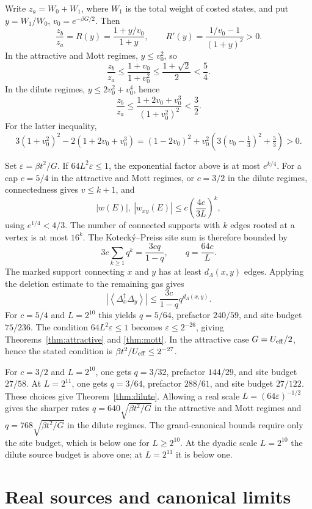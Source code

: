 \documentclass[11pt]{article}
\newcommand{\Deltaop}{\Delta}
\begin{document}
Write $z_a=W_0+W_1$, where $W_1$ is the total weight of costed states, and put $y=W_1/W_0$, $v_0=e^{-\beta G/2}$. Then
\[
 \frac{z_b}{z_a}=R(y)=\frac{1+y/v_0}{1+y},
 \qquad R'(y)=\frac{1/v_0-1}{(1+y)^2}>0.
\]
In the attractive and Mott regimes, $y\le v_0^2$, so
\[
 \frac{z_b}{z_a}\le\frac{1+v_0}{1+v_0^2}
 \le\frac{1+\sqrt2}{2}<\frac54.
\]
In the dilute regimes, $y\le2v_0^2+v_0^4$, hence
\[
 \frac{z_b}{z_a}\le\frac{1+2v_0+v_0^3}{(1+v_0^2)^2}<\frac32.
\]
For the latter inequality,
\[
 3(1+v_0^2)^2-2(1+2v_0+v_0^3)
 =(1-2v_0)^2+v_0^2\left(3(v_0-\tfrac13)^2+\tfrac53\right)>0.
\]

Set $\varepsilon=\beta t^2/G$. If $64L^2\varepsilon\le1$, the exponential factor above is at most $e^{k/4}$. For a cap $c=5/4$ in the attractive and Mott regimes, or $c=3/2$ in the dilute regimes, connectedness gives $v\le k+1$, and
\[
 |w(E)|,\ |w_{xy}(E)|\le c\left(\frac{4c}{3L}\right)^k,
\]
using $e^{1/4}<4/3$. The number of connected supports with $k$ edges rooted at a vertex is at most $16^k$. The Kotecký–Preiss site sum is therefore bounded by
\[
 3c\sum_{k\ge1}q^k=\frac{3cq}{1-q},
 \qquad q=\frac{64c}{L}.
\]
The marked support connecting $x$ and $y$ has at least $d_\Lambda(x,y)$ edges. Applying the deletion estimate to the remaining gas gives
\[
 \left|\left\langle\Deltaop_x^\dagger\Deltaop_y\right\rangle\right|
 \le\frac{3c}{1-q}q^{d_\Lambda(x,y)}.
\]
For $c=5/4$ and $L=2^{10}$ this yields $q=5/64$, prefactor $240/59$, and site budget $75/236$. The condition $64L^2\varepsilon\le1$ becomes $\varepsilon\le2^{-26}$, giving Theorems~\ref{thm:attractive} and \ref{thm:mott}. In the attractive case $G=U_{\rm eff}/2$, hence the stated condition is $\beta t^2/U_{\rm eff}\le2^{-27}$.

For $c=3/2$ and $L=2^{10}$, one gets $q=3/32$, prefactor $144/29$, and site budget $27/58$. At $L=2^{11}$, one gets $q=3/64$, prefactor $288/61$, and site budget $27/122$. These choices give Theorem~\ref{thm:dilute}. Allowing a real scale $L=(64\varepsilon)^{-1/2}$ gives the sharper rates $q=640\sqrt{\beta t^2/G}$ in the attractive and Mott regimes and $q=768\sqrt{\beta t^2/G}$ in the dilute regimes. The grand-canonical bounds require only the site budget, which is below one for $L\ge2^{10}$. At the dyadic scale $L=2^{10}$ the dilute source budget is above one; at $L=2^{11}$ it is below one.

\section{Real sources and canonical limits}
\end{document}
